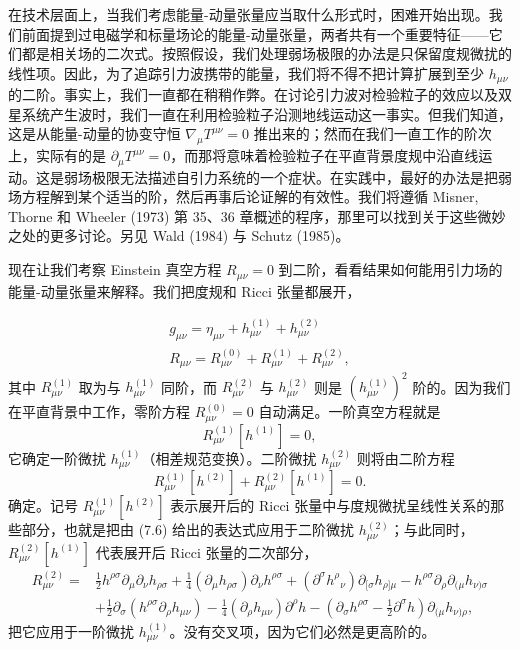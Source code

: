 在技术层面上，当我们考虑能量-动量张量应当取什么形式时，困难开始出现。我们前面提到过电磁学和标量场论的能量-动量张量，两者共有一个重要特征——它们都是相关场的二次式。按照假设，我们处理弱场极限的办法是只保留度规微扰的线性项。因此，为了追踪引力波携带的能量，我们将不得不把计算扩展到至少 $h_{\mu\nu}$ 的二阶。事实上，我们一直都在稍稍作弊。在讨论引力波对检验粒子的效应以及双星系统产生波时，我们一直在利用检验粒子沿测地线运动这一事实。但我们知道，这是从能量-动量的协变守恒 $\nabla_\mu T^{\mu\nu} = 0$ 推出来的；然而在我们一直工作的阶次上，实际有的是 $\partial_\mu T^{\mu\nu} = 0$，而那将意味着检验粒子在平直背景度规中沿直线运动。这是弱场极限无法描述自引力系统的一个症状。在实践中，最好的办法是把弱场方程解到某个适当的阶，然后再事后论证解的有效性。我们将遵循 Misner, Thorne 和 Wheeler (1973) 第 35、36 章概述的程序，那里可以找到关于这些微妙之处的更多讨论。另见 Wald (1984) 与 Schutz (1985)。

现在让我们考察 Einstein 真空方程 $R_{\mu\nu} = 0$ 到二阶，看看结果如何能用引力场的能量-动量张量来解释。我们把度规和 Ricci 张量都展开，


\begin{gather*}
g_{\mu\nu} = \eta_{\mu\nu} + h^{(1)}_{\mu\nu} + h^{(2)}_{\mu\nu} \\
R_{\mu\nu} = R^{(0)}_{\mu\nu} + R^{(1)}_{\mu\nu} + R^{(2)}_{\mu\nu},
\tag{7.150}
\end{gather*}
其中 $R^{(1)}_{\mu\nu}$ 取为与 $h^{(1)}_{\mu\nu}$ 同阶，而 $R^{(2)}_{\mu\nu}$ 与 $h^{(2)}_{\mu\nu}$ 则是 $(h^{(1)}_{\mu\nu})^{2}$ 阶的。因为我们在平直背景中工作，零阶方程 $R^{(0)}_{\mu\nu} = 0$ 自动满足。一阶真空方程就是
\begin{equation*}
R^{(1)}_{\mu\nu}[h^{(1)}] = 0,
\tag{7.151}
\end{equation*}
它确定一阶微扰 $h^{(1)}_{\mu\nu}$（相差规范变换）。二阶微扰 $h^{(2)}_{\mu\nu}$ 则将由二阶方程
\begin{equation*}
R^{(1)}_{\mu\nu}[h^{(2)}] + R^{(2)}_{\mu\nu}[h^{(1)}] = 0.
\tag{7.152}
\end{equation*}
确定。记号 $R^{(1)}_{\mu\nu}[h^{(2)}]$ 表示展开后的 Ricci 张量中与度规微扰呈线性关系的那些部分，也就是把由 (7.6) 给出的表达式应用于二阶微扰 $h^{(2)}_{\mu\nu}$；与此同时，$R^{(2)}_{\mu\nu}[h^{(1)}]$ 代表展开后 Ricci 张量的二次部分，
\begin{align*}
R^{(2)}_{\mu\nu} ={}& \frac{1}{2}h^{\rho\sigma}\partial_\mu\partial_\nu h_{\rho\sigma} + \frac{1}{4}(\partial_\mu h_{\rho\sigma})\partial_\nu h^{\rho\sigma} + (\partial^\sigma h^{\rho}{}_{\nu})\partial_{[\sigma}h_{\rho]\mu} - h^{\rho\sigma}\partial_\rho\partial_{(\mu}h_{\nu)\sigma} \\
&+ \frac{1}{2}\partial_\sigma(h^{\rho\sigma}\partial_\rho h_{\mu\nu}) - \frac{1}{4}(\partial_\rho h_{\mu\nu})\partial^\rho h - \left(\partial_\sigma h^{\rho\sigma} - \frac{1}{2}\partial^\sigma h\right)\partial_{(\mu}h_{\nu)\rho},
\tag{7.153}
\end{align*}
把它应用于一阶微扰 $h^{(1)}_{\mu\nu}$。没有交叉项，因为它们必然是更高阶的。

